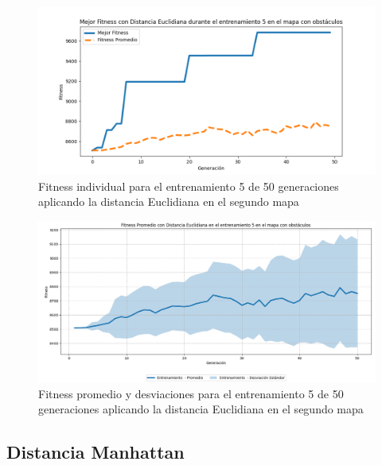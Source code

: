 \documentclass[conference]{IEEEtran}
\begin{document}
\begin{figure}[H]
    \centering
    \includegraphics[width=0.9 \linewidth]{Euclidiana/Mapa2/Fitness_5_Map2_Eucli_50Gen.png}
    \caption{Fitness individual para el entrenamiento 5 de 50 generaciones aplicando la distancia Euclidiana en el segundo mapa}
    \label{fig:eucli_5_50_m2}
\end{figure}
\begin{figure}[H]
    \centering
    \includegraphics[width=0.9 \linewidth]{Euclidiana/Mapa2/Fitness_5_Map2_Eucli_50Gen_Sombra.png}
    \caption{Fitness promedio y desviaciones para el entrenamiento 5 de 50 generaciones aplicando la distancia Euclidiana en el segundo mapa}
    \label{fig:eucli_5_50_sombra_m2}
\end{figure}


\subsection{Distancia Manhattan}
\setcounter{figure}{0}
\renewcommand{\thefigure}{S\arabic{figure}-MM2}
\end{document}
